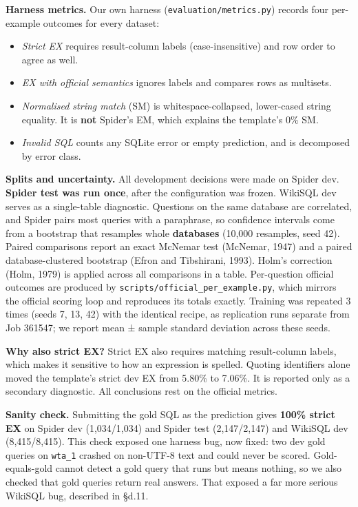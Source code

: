 \documentclass[
  10pt,
]{article}
\providecommand{\tightlist}{%
  \setlength{\itemsep}{0pt}\setlength{\parskip}{0pt}}
\begin{document}
\textbf{Harness metrics.} Our own harness
(\texttt{evaluation/metrics.py}) records four per-example outcomes for
every dataset:

\begin{itemize}
\tightlist
\item
  \emph{Strict EX} requires result-column labels (case-insensitive) and
  row order to agree as well.
\item
  \emph{EX with official semantics} ignores labels and compares rows as
  multisets.
\item
  \emph{Normalised string match} (SM) is whitespace-collapsed,
  lower-cased string equality. It is \textbf{not} Spider's EM, which
  explains the template's 0\% SM.
\item
  \emph{Invalid SQL} counts any SQLite error or empty prediction, and is
  decomposed by error class.
\end{itemize}

\textbf{Splits and uncertainty.} All development decisions were made on
Spider dev. \textbf{Spider test was run once}, after the configuration
was frozen. WikiSQL dev serves as a single-table diagnostic. Questions
on the same database are correlated, and Spider pairs most queries with
a paraphrase, so confidence intervals come from a bootstrap that
resamples whole \textbf{databases} (10,000 resamples, seed 42). Paired
comparisons report an exact McNemar test (McNemar, 1947) and a paired
database-clustered bootstrap (Efron and Tibshirani, 1993). Holm's
correction (Holm, 1979) is applied across all comparisons in a table.
Per-question official outcomes are produced by
\texttt{scripts/official\_per\_example.py}, which mirrors the official
scoring loop and reproduces its totals exactly. Training was repeated 3
times (seeds 7, 13, 42) with the identical recipe, as replication runs
separate from Job 361547; we report mean ± sample standard deviation
across these seeds.

\textbf{Why also strict EX?} Strict EX also requires matching
result-column labels, which makes it sensitive to how an expression is
spelled. Quoting identifiers alone moved the template's strict dev EX
from 5.80\% to 7.06\%. It is reported only as a secondary diagnostic.
All conclusions rest on the official metrics.

\textbf{Sanity check.} Submitting the gold SQL as the prediction gives
\textbf{100\% strict EX} on Spider dev (1,034/1,034) and Spider test
(2,147/2,147) and WikiSQL dev (8,415/8,415). This check exposed one
harness bug, now fixed: two dev gold queries on \texttt{wta\_1} crashed
on non-UTF-8 text and could never be scored. Gold-equals-gold cannot
detect a gold query that runs but means nothing, so we also checked that
gold queries return real answers. That exposed a far more serious
WikiSQL bug, described in §d.11.
\end{document}
